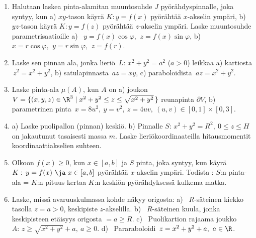\Harj
\begin{enumerate}

\item \label{H-Uint-9: pyörähdyspintojen muuntosuhteet} 
Halutaan laskea pinta-alamitan muuntosuhde $J$ pyörähdyspinnalle, joka syntyy, kun
a) $xy$-tason käyrä $K: y=f(x)$ pyörähtää $x$-akselin ympäri, b) $yz$-tason käyrä
$K: y=f(z)$ pyörähtää $z$-akselin ympäri. Laske muuntosuhde
parametrisaatioille \vspace{1mm}\newline
a) \ $y=f(x)\cos\varphi,\,\ z=f(x)\sin\varphi$, \newline 
b) \ $x=r\cos\varphi,\,\ y=r\sin\varphi,\,\ z=f(r)$.

\item
Laske sen pinnan ala, jonka lieriö $\,L:\, x^2+y^2=a^2$ ($a>0$) leikkaa \vspace{1mm}\newline
a) kartiosta $\,z^2=x^2+y^2$, \newline
b) satulapinnasta $\,az=xy$, \newline
c) paraboloidista $\,az=x^2+y^2$. 

\item
Laske pinta-ala $\mu(A)$, kun $A$ on \vspace{1mm}\newline
a) joukon $V=\{(x,y,z)\in\R^3 \mid x^2+y^2 \le z \le \sqrt{x^2+y^2}\,\}$ 
   reunapinta $\partial V$, \newline
b) parametrinen pinta $\,x=8u^2,\ y=v^2,\ z=4uv,\ (u,v)\in[0,1]\times[0,3]$.

\item
a) Laske puolipallon (pinnan) keskiö. \vspace{1mm}\newline
b) Pinnalle $S:\,x^2+y^2=R^2,\ 0 \le z \le H$ on jakautunut tasaisesti massa $m$. Laske
lieriökoordinaateilla hitausmomentit koordinaattiakselien suhteen.

\item {}
Olkoon $f(x) \ge 0$, kun $x\in[a,b]$ ja $S$ pinta, joka syntyy, kun käyrä
$K:\,y=f(x)\ \ja\ x\in[a,b]$ pyörähtää $x$-akselin ympäri. Todista :
$S$:n pinta-ala = $K$:n pituus kertaa $K$:n keskiön pyörähdyksessä kulkema matka.

\item
Laske, missä avaruuskulmassa kohde näkyy origosta: \vspace{1mm}\newline
a) \ $R$-säteinen kiekko tasolla $z=a>0$, keskipiste $z$-akselilla. \newline
b) \ $R$-säteinen kuula, jonka keskipisteen etäisyys origosta $=a \ge R$. \newline
c) \ Puolikartion rajaama joukko $A:\,z\ge\sqrt{x^2+y^2}+a,\ a \ge 0$. \newline
d) \ Pararaboloidi $\,z=x^2+y^2+a, \ a\in\R$.


\end{enumerate}

